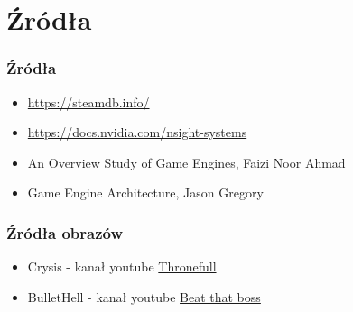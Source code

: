     \section{Źródła}
\begin{frame}
  \frametitle{Źródła}
    \begin{itemize}
        \item \href{https://steamdb.info/}{https://steamdb.info/}
    \item \href{https://docs.nvidia.com/nsight-systems}{https://docs.nvidia.com/nsight-systems}
    \item An Overview Study of Game Engines, Faizi Noor Ahmad 
    \item Game Engine Architecture, Jason Gregory
    \end{itemize}
    \end{frame}

    \begin{frame}
      \frametitle{Źródła obrazów}
        \begin{itemize}
          \item Crysis - kanał youtube \href{https://www.youtube.com/watch?v=vGjOALIrL_U}{Thronefull}
          \item BulletHell - kanał youtube \href{https://www.youtube.com/watch?app=desktop&v=h-wr6LoETA0}{Beat that boss}
        \end{itemize}
    \end{frame}

